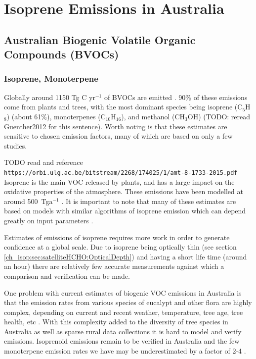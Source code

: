 
\chapter{Isoprene Emissions in Australia} %
\label{ch_isop} %

\section{Australian Biogenic Volatile Organic Compounds (BVOCs)}
  \label{ch_isop:sec:bvoc}

  \subsection{Isoprene, Monoterpene}
  
    Globally around 1150 Tg C yr$^{-1}$ of BVOCs are emitted \citep{Guenther1995}.
    90\% of these emissions come from plants and trees, with the most dominant species being isoprene (C$_5$H$_8$) (about 61\%), monoterpenes (C$_10$H$_16$), and methanol (CH$_3$OH) \citep{Guenther2012,Lathiere2006} (TODO: reread Guenther2012 for this sentence).
    Worth noting is that these estimates are sensitive to chosen emission factors, many of which are based on only a few studies.
  
    TODO read and reference \verb|https://orbi.ulg.ac.be/bitstream/2268/174025/1/amt-8-1733-2015.pdf|
    Isoprene is the main VOC released by plants, and has a large impact on the oxidative properties of the atmosphere. 
    These emissions have been modelled at around 500~Tga$^{-1}$ \citep{todo:}.
    It is important to note that many of these estimates are based on models with similar algorithms of isoprene emission which can depend greatly on input parameters \citep{Niinemets2010}. 
    
    Estimates of emissions of isoprene requires more work in order to generate confidence at a global scale.
    Due to isoprene being optically thin (see section \ref{ch_isop:sec:satelliteHCHO:OpticalDepth}) and having a short life time (around an hour) there are relatively few accurate measurements against which a comparison and verification can be made. 
    
    One problem with current estimates of biogenic VOC emissions in Australia is that the emission rates from various species of eucalypt and other flora are highly complex, depending on current and recent weather, temperature, tree age, tree health, etc \citep{Guenther2012}. 
    With this complexity added to the diversity of tree species in Australia as well as sparse rural data collections it is hard to model and verify emissions.
    Isoprenoid emissions remain to be verified in Australia and the few monoterpene emission rates we have may be underestimated by a factor of 2-4 \citep{Winters2009}.

